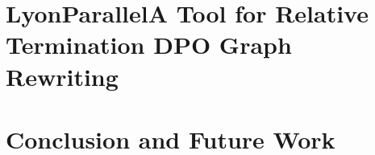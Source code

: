 \documentclass{report}
\begin{document}

%  


 
\chapter{LyonParallel\textemdash A Tool for Relative Termination DPO Graph Rewriting} 
\label{chap:lyonparallel}

\chapter{Conclusion and Future Work}
\label{chap:conclusion}



\printbibliography
\end{document}
